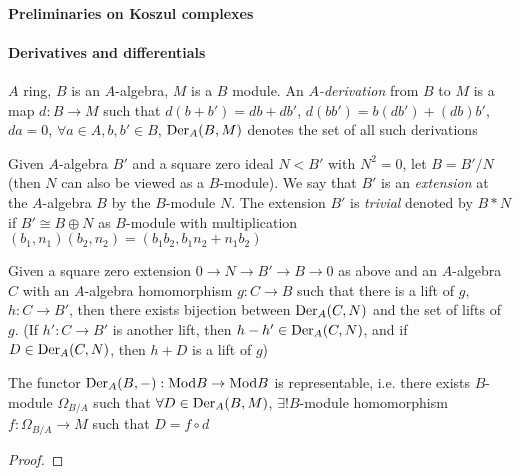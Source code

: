 \documentclass[main]{subfiles}
\begin{document}
\paragraph{Preliminaries on Koszul complexes}

\paragraph{Derivatives and differentials}

\begin{definition}
$A$ ring, $B$ is an $A$-algebra, $M$ is a $B$ module. An \textit{$A$-derivation} from $B$ to $M$ is a map $d:B\to M$ such that $d(b+b')=db+db'$, $d(bb')=b(db')+(db)b'$, $da=0$, $\forall a\in A,b,b'\in B$, $\operatorname{Der}_A(B,M)$ denotes the set of all such derivations
\end{definition}

\begin{definition}
Given $A$-algebra $B'$ and a square zero ideal $N<B'$ with $N^2=0$, let $B=B'/N$(then $N$ can also be viewed as a $B$-module). We say that $B'$ is an \textit{extension} at the $A$-algebra $B$ by the $B$-module $N$. The extension $B'$ is \textit{trivial} denoted by $B*N$ if $B'\cong B\oplus N$ as $B$-module with multiplication $(b_1,n_1)(b_2,n_2)=(b_1b_2,b_1n_2+n_1b_2)$
\end{definition}

\clubsuit\quad Given a square zero extension $0\to N\to B'\to B\to0$ as above and an $A$-algebra $C$ with an $A$-algebra homomorphism $g:C\to B$ such that there is a lift of $g$, $h:C\to B'$, then there exists bijection between $\operatorname{Der}_A(C,N)$ and the set of lifts of $g$. (If $h':C\to B'$ is another lift, then $h-h'\in\operatorname{Der}_A(C,N)$, and if $D\in \operatorname{Der}_A(C,N)$, then $h+D$ is a lift of $g$)

\clubsuit\quad The functor $\operatorname{Der}_A(B,-):\text{Mod}B\to\text{Mod}B$ is representable, i.e. there exists $B$-module $\Omega_{B/A}$ such that $\forall D\in \operatorname{Der}_A(B,M)$, $\exists!B$-module homomorphism $f:\Omega_{B/A}\to M$ such that $D=f\circ d$
\begin{center}
\end{center}

\begin{proof}

\end{proof}
\end{document}
